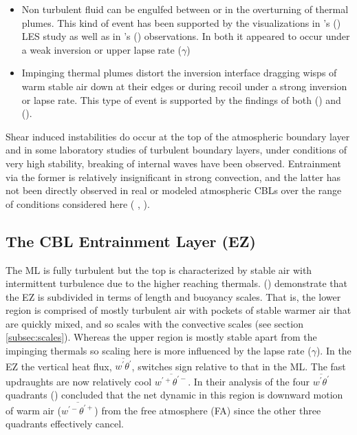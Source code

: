 \begin{itemize}

\item{Non turbulent fluid can be engulfed between or in the overturning of thermal plumes. This kind of event has been supported by the visualizations in \citeauthor{SullMoengStev}'s (\citeyear{SullMoengStev}) \acs{LES} study as well as in \citeauthor{Traum11}'s (\citeyear{Traum11}) observations. In both it appeared to occur under a weak inversion or upper lapse rate ($\gamma$)}

\item{
Impinging thermal plumes distort the inversion interface dragging wisps of warm stable air down at their edges or during recoil under a strong inversion or lapse rate. This type of event is supported by the findings  of both \citeauthor{SullMoengStev} (\citeyear{SullMoengStev}) and \citeauthor{Traum11} (\citeyear{Traum11}).}

\end{itemize}

Shear induced instabilities do occur at the top of the atmospheric boundary layer and in some laboratory studies of turbulent boundary layers, under conditions of very high stability, breaking of internal waves have been observed.  Entrainment via the former is relatively insignificant in strong convection, and the latter has not been directly observed in real or modeled atmospheric \acs{CBL}s over the range of conditions considered here (\citeauthor{Traum11} \citeyear{Traum11}, \citeauthor{SullMoengStev} \citeyear{SullMoengStev}).

\subsection{The CBL Entrainment Layer (EZ)}
\label{subsec:cblel}

The \acs{ML} is fully turbulent but the top is characterized by stable air with intermittent turbulence due to the higher reaching thermals. \citeauthor{GarciaMellado} (\citeyear{GarciaMellado}) demonstrate that the \acs{EZ} is subdivided in terms of length and buoyancy scales.  That is, the lower region is comprised of mostly turbulent air with pockets of stable warmer air that are quickly mixed, and so scales with the convective scales (see section \ref{subsec:scales}). Whereas the upper region is mostly stable apart from the impinging thermals so scaling here is more influenced by the lapse rate ($\gamma$).  In the \acs{EZ} the vertical heat flux, $\overline{w^{'}\theta^{'}}$, switches sign relative to that in the \acs{ML}.  The fast updraughts are now relatively cool $\overline{w^{'+}\theta^{'-}}$.  In their analysis of the four $\overline{w^{'}\theta^{'}}$ quadrants \citeauthor{SullMoengStev} (\citeyear{SullMoengStev}) concluded that the net dynamic in this region is downward motion of warm air ($\overline{w^{'-}\theta^{'+}}$) from the free atmosphere (\acs{FA}) since the other three quadrants effectively cancel.\\

